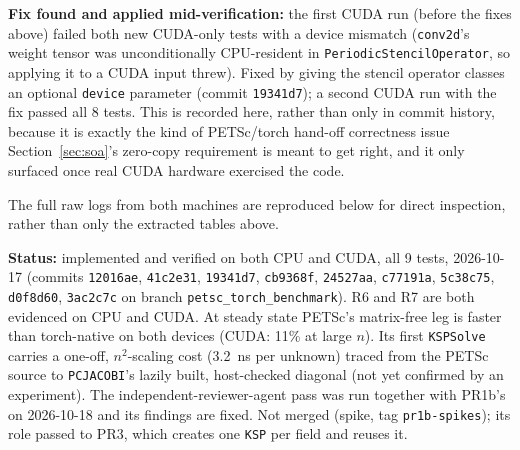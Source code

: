 \documentclass[11pt]{article}
\newcommand{\status}[1]{\textcolor{marlinteal}{\textbf{Status:}} #1}
\begin{document}
\textbf{Fix found and applied mid-verification:} the first CUDA run
(before the fixes above) failed both new CUDA-only tests with a device
mismatch (\texttt{conv2d}'s weight tensor was unconditionally CPU-resident
in \texttt{PeriodicStencilOperator}, so applying it to a CUDA input threw).
Fixed by giving the stencil operator classes an optional \texttt{device}
parameter (commit \texttt{19341d7}); a second CUDA run with the fix passed
all 8 tests. This is recorded here, rather than only in commit history,
because it is exactly the kind of PETSc/torch hand-off correctness issue
Section~\ref{sec:soa}'s zero-copy requirement is meant to get right, and it
only surfaced once real CUDA hardware exercised the code.

The full raw logs from both machines are reproduced below for direct
inspection, rather than only the extracted tables above.







\status{implemented and verified on both CPU and CUDA, all 9 tests,
2026-10-17 (commits \texttt{12016ae}, \texttt{41c2e31}, \texttt{19341d7},
\texttt{cb9368f}, \texttt{24527aa}, \texttt{c77191a}, \texttt{5c38c75},
\texttt{d0f8d60}, \texttt{3ac2c7c} on branch \texttt{petsc\_torch\_benchmark}).
R6 and R7 are both evidenced on CPU and CUDA. At steady state PETSc's
matrix-free leg is faster than torch-native on both devices (CUDA: 11\% at
large $n$). Its first \texttt{KSPSolve} carries a one-off, $n^{2}$-scaling
cost (3.2~ns per unknown) traced from the PETSc source to
\texttt{PCJACOBI}'s lazily built, host-checked diagonal (not yet confirmed by
an experiment). The independent-reviewer-agent pass was run together with
PR1b's on 2026-10-18 and its findings are fixed. Not merged (spike, tag
\texttt{pr1b-spikes}); its role passed to PR3, which creates one
\texttt{KSP} per field and reuses it.}
\end{document}
